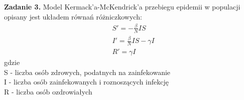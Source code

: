 \documentclass[11pt, leqno]{scrartcl}
\begin{document}
    \subsection*{}
    \textbf{Zadanie 3.} Model Kermack'a-McKendrick'a przebiegu
    epidemii w populacji opisany jest układem równań
    różniczkowych:
    \begin{align*}
        &S'=-\frac{\beta}{N}IS \\
        &I'=\frac{\beta}{N}IS-\gamma I \\
        &R'=\gamma I
    \end{align*}
    gdzie \\
    S - liczba osób zdrowych, podatnych na zainfekowanie \\
    I - liczba osób zainfekowanych i roznoszących infekcję \\
    R - liczba osób ozdrowiałych
\end{document}
